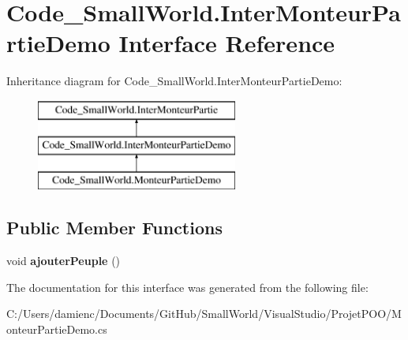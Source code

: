 \hypertarget{interface_code___small_world_1_1_inter_monteur_partie_demo}{\section{Code\-\_\-\-Small\-World.\-Inter\-Monteur\-Partie\-Demo Interface Reference}
\label{interface_code___small_world_1_1_inter_monteur_partie_demo}
}
Inheritance diagram for Code\-\_\-\-Small\-World.\-Inter\-Monteur\-Partie\-Demo\-:\begin{figure}[H]
\begin{center}
\leavevmode
\includegraphics[height=3.000000cm]{interface_code___small_world_1_1_inter_monteur_partie_demo}
\end{center}
\end{figure}
\subsection*{Public Member Functions}
\begin{DoxyCompactItemize}
\item 
\hypertarget{interface_code___small_world_1_1_inter_monteur_partie_demo_aae0ae232e14a6051532071bb40d42aad}{void {\bfseries ajouter\-Peuple} ()}\label{interface_code___small_world_1_1_inter_monteur_partie_demo_aae0ae232e14a6051532071bb40d42aad}

\end{DoxyCompactItemize}


The documentation for this interface was generated from the following file\-:\begin{DoxyCompactItemize}
\item 
C\-:/\-Users/damienc/\-Documents/\-Git\-Hub/\-Small\-World/\-Visual\-Studio/\-Projet\-P\-O\-O/Monteur\-Partie\-Demo.\-cs\end{DoxyCompactItemize}
